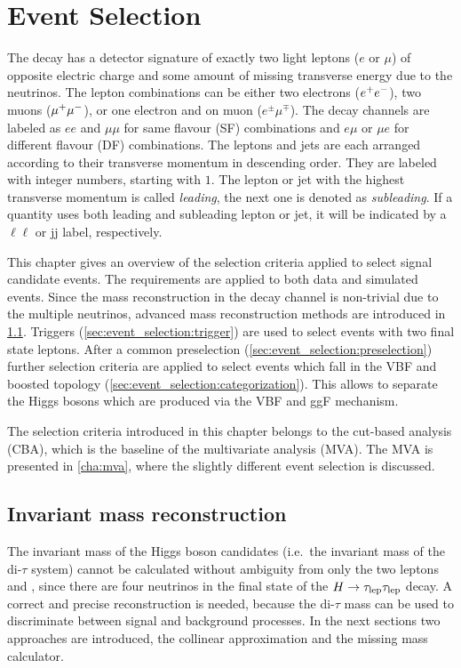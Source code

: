 \chapter{Event Selection}\label{cha:event_selection}

The \Httllfull{} decay has a detector signature of exactly two light leptons ($e$ or $\mu$) of opposite electric
charge and some amount of missing transverse energy due to the neutrinos.
The lepton combinations can be either two electrons ($e^+e^-$), two muons ($\mu^+\mu^-$), or one electron and on muon ($e^\pm \mu^\mp$).
The decay channels are labeled as $ee$ and $\mu\mu$ for same flavour (SF) combinations and $e\mu$ or $\mu e$ for
different flavour (DF) combinations.
The leptons and jets are each arranged according to their transverse momentum in descending order.
They are labeled with integer numbers, starting with $1$.
The lepton or jet with the highest transverse momentum is called \emph{leading},
the next one is denoted as \emph{subleading}.
If a quantity uses both leading and subleading lepton or jet, it will be indicated by a $\ell\ell$ or jj label, respectively.

This chapter gives an overview of the selection criteria applied to select signal candidate events.
The requirements are applied to both data and simulated events.
Since the mass reconstruction in the \Httllfull{} decay channel is non-trivial due to the multiple neutrinos,
advanced mass reconstruction methods are introduced in \cref{sec:event_selection:mass}.
Triggers (\cref{sec:event_selection:trigger}) are used to select events with two final state leptons.
After a common preselection (\cref{sec:event_selection:preselection}) further selection criteria are applied
to select events which fall in the VBF and boosted topology (\cref{sec:event_selection:categorization}).
This allows to separate the Higgs bosons which are produced via the VBF and ggF mechanism.

The selection criteria introduced in this chapter belongs to the cut-based analysis (CBA), which is the baseline
of the multivariate analysis (MVA). The MVA is presented in \cref{cha:mva}, where the slightly different event selection is discussed.

\section{Invariant mass reconstruction}\label{sec:event_selection:mass}

The invariant mass of the Higgs boson candidates (i.e.\ the invariant mass of the di-$\tau$ system)
cannot be calculated without ambiguity from only the two leptons and \etmiss, since there are four neutrinos in the final state of the $H \to \tau_\text{lep} \tau_\text{lep}$ decay.
A correct and precise reconstruction is needed, because the di-$\tau$ mass can be used to discriminate between signal and background processes.
In the next sections two approaches are introduced, the collinear approximation and the missing mass calculator.

